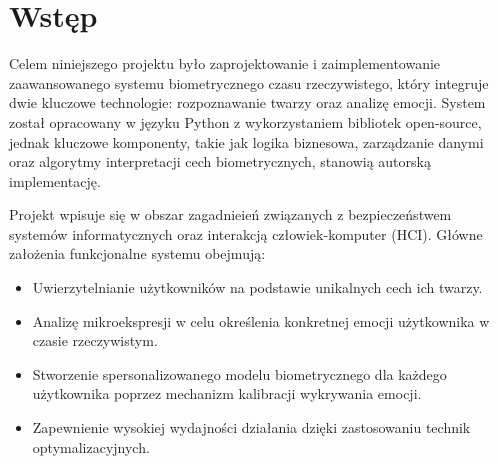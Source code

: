 \chapter{Wstęp}
\label{chap:wstep}

Celem niniejszego projektu było zaprojektowanie i zaimplementowanie zaawansowanego systemu biometrycznego czasu rzeczywistego, który integruje dwie kluczowe technologie: rozpoznawanie twarzy oraz analizę emocji. System został opracowany w języku Python z wykorzystaniem bibliotek open-source, jednak kluczowe komponenty, takie jak logika biznesowa, zarządzanie danymi oraz algorytmy interpretacji cech biometrycznych, stanowią autorską implementację.

Projekt wpisuje się w obszar zagadnieień związanych z bezpieczeństwem systemów informatycznych oraz interakcją człowiek-komputer (HCI). Główne założenia funkcjonalne systemu obejmują:
\begin{itemize}
    \item Uwierzytelnianie użytkowników na podstawie unikalnych cech ich twarzy.
    \item Analizę mikroekspresji w celu określenia konkretnej emocji użytkownika w czasie rzeczywistym.
    \item Stworzenie spersonalizowanego modelu biometrycznego dla każdego użytkownika poprzez mechanizm kalibracji wykrywania emocji.
    \item Zapewnienie wysokiej wydajności działania dzięki zastosowaniu technik optymalizacyjnych.
\end{itemize}
